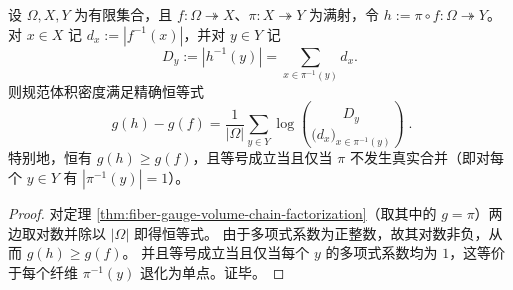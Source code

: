 \begin{corollary}[规范体积密度的条件阶乘链式律]\label{cor:fiber-gauge-volume-density-conditional-factorial-chain}
设 \(\Omega,X,Y\) 为有限集合，且 \(f:\Omega\twoheadrightarrow X\)、\(\pi:X\twoheadrightarrow Y\) 为满射，令 \(h:=\pi\circ f:\Omega\twoheadrightarrow Y\)。
对 \(x\in X\) 记 \(d_x:=|f^{-1}(x)|\)，并对 \(y\in Y\) 记
\[
D_y:=|h^{-1}(y)|=\sum_{x\in\pi^{-1}(y)}d_x.
\]
则规范体积密度满足精确恒等式
\[
\boxed{\;
g(h)-g(f)
=\frac{1}{|\Omega|}\sum_{y\in Y}\log\binom{D_y}{\bigl(d_x\bigr)_{x\in\pi^{-1}(y)}}\; }.
\]
特别地，恒有 \(g(h)\ge g(f)\)，且等号成立当且仅当 \(\pi\) 不发生真实合并（即对每个 \(y\in Y\) 有 \(|\pi^{-1}(y)|=1\)）。
\end{corollary}
\begin{proof}
对定理 \ref{thm:fiber-gauge-volume-chain-factorization}（取其中的 \(g=\pi\)）两边取对数并除以 \(|\Omega|\) 即得恒等式。
由于多项式系数为正整数，故其对数非负，从而 \(g(h)\ge g(f)\)。
并且等号成立当且仅当每个 \(y\) 的多项式系数均为 \(1\)，这等价于每个纤维 \(\pi^{-1}(y)\) 退化为单点。证毕。
\end{proof}

